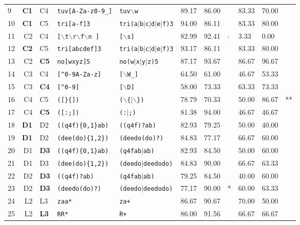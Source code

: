 \begin{table*}[ht]
\begin{tabular}{p{0.3cm}r@{ -- }lp{4cm}p{4cm}|p{0.99cm}p{0.99cm}p{0.6cm}|p{0.99cm}p{0.99cm}p{0.6cm}}
  9 & {\bf C1} & C4 & {\tt tuv[A-Za-z0-9\_]} & {\tt tuv$\backslash$w} & 89.17 & 86.00 &   & 83.33 & 70.00 &   \\ 
    10 & {\bf C1} & C5 & {\tt tri[a-f]3} & {\tt tri(a$|$b$|$c$|$d$|$e$|$f)3} & 94.00 & 86.11 &   & 83.33 & 80.00 &   \\ 
  11 & C2 & C4 & {\tt [$\backslash$t$\backslash$r$\backslash$f$\backslash$n ]} & {\tt [$\backslash$s]} & 82.99 & 92.41 & $\cdot$ & 3.33 & 0.00 &   \\ 
  12 & {\bf C2} & C5 & {\tt tri[abcdef]3} & {\tt tri(a$|$b$|$c$|$d$|$e$|$f)3} & 93.17 & 86.11 &   & 83.33 & 80.00 &   \\ 
  13 & C2 & {\bf C5} & {\tt no[wxyz]5} & {\tt no(w$|$x$|$y$|$z)5} & 87.17 & 93.67 &   & 86.67 & 96.67 &   \\ 
  14 & C3 & C4 & {\tt [\verb|^|0-9A-Za-z]} & {\tt [$\backslash$W\_]} & 64.50 & 61.00 &   & 46.67 & 53.33 &   \\ 
  15 & C3 & {\bf C4} & {\tt [\verb|^|0-9]} & {\tt [$\backslash$D]} & 58.00 & 73.33 &   & 63.33 & 73.33 &   \\ 
  16 & C4 & C5 & {\tt ([\}\{])} & {\tt ($\backslash$\{$|$$\backslash$\})} & 78.79 & 70.33 &   & 50.00 & 86.67 & ** \\ 
  17 & C4 & {\bf C5} & {\tt ([:;])} & {\tt (:$|$;)} & 81.38 & 94.00 &   & 46.67 & 46.67 &   \\ 
  \hline
  
  18 & {\bf D1} & D2 & {\tt ((q4f)\{0,1\}ab)} & {\tt ((q4f)?ab)} & 82.93 & 79.25 &   & 50.00 & 40.00 &   \\ 
  19 & {\bf D1} & D2 & {\tt (dee(do)\{1,2\})} & {\tt (deedo(do)?)} & 84.83 & 77.17 &   & 66.67 & 60.00 &   \\ 
  20 & D1 & {\bf D3} & {\tt ((q4f)\{0,1\}ab)} & {\tt (q4fab$|$ab)} & 82.93 & 84.50 &   & 50.00 & 60.00 &   \\ 
  21 & D1 & D3 & {\tt (dee(do)\{1,2\})} & {\tt (deedo$|$deedodo)} & 84.83 & 90.00 &   & 66.67 & 63.33 &   \\ 

  22 & D2 & {\bf D3} & {\tt ((q4f)?ab)} & {\tt (q4fab$|$ab)} & 79.25 & 84.50 &   & 40.00 & 60.00 &   \\ 
  23 & D2 & {\bf D3} & {\tt (deedo(do)?)} & {\tt (deedo$|$deedodo)} & 77.17 & 90.00 & * & 60.00 & 63.33 &   \\ 
  \hline
  
  24 & L2 & L3 & {\tt zaa*} & {\tt za+} & 86.67 & 90.67 &   & 70.00 & 50.00 &   \\ 
  25 & L2 & {\bf L3} & {\tt RR*} & {\tt R+} & 86.00 & 91.56 &   & 66.67 & 66.67 &   \\ 
  \hline
  

\end{tabular}
\end{table*}
